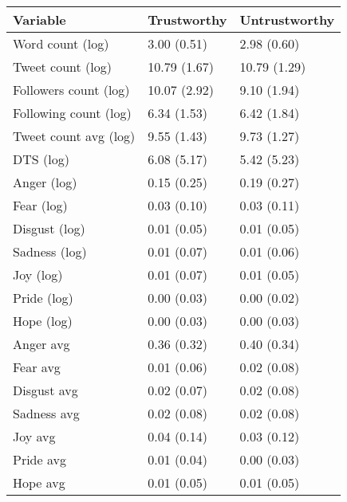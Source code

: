\begin{tabular}{lll}
\toprule
             Variable &  Trustworthy & Untrustworthy \\
\midrule
     Word count (log) &  3.00 (0.51) &   2.98 (0.60) \\
    Tweet count (log) & 10.79 (1.67) &  10.79 (1.29) \\
Followers count (log) & 10.07 (2.92) &   9.10 (1.94) \\
Following count (log) &  6.34 (1.53) &   6.42 (1.84) \\
Tweet count avg (log) &  9.55 (1.43) &   9.73 (1.27) \\
            DTS (log) &  6.08 (5.17) &   5.42 (5.23) \\
          Anger (log) &  0.15 (0.25) &   0.19 (0.27) \\
           Fear (log) &  0.03 (0.10) &   0.03 (0.11) \\
        Disgust (log) &  0.01 (0.05) &   0.01 (0.05) \\
        Sadness (log) &  0.01 (0.07) &   0.01 (0.06) \\
            Joy (log) &  0.01 (0.07) &   0.01 (0.05) \\
          Pride (log) &  0.00 (0.03) &   0.00 (0.02) \\
           Hope (log) &  0.00 (0.03) &   0.00 (0.03) \\
            Anger avg &  0.36 (0.32) &   0.40 (0.34) \\
             Fear avg &  0.01 (0.06) &   0.02 (0.08) \\
          Disgust avg &  0.02 (0.07) &   0.02 (0.08) \\
          Sadness avg &  0.02 (0.08) &   0.02 (0.08) \\
              Joy avg &  0.04 (0.14) &   0.03 (0.12) \\
            Pride avg &  0.01 (0.04) &   0.00 (0.03) \\
             Hope avg &  0.01 (0.05) &   0.01 (0.05) \\
\bottomrule
\end{tabular}
